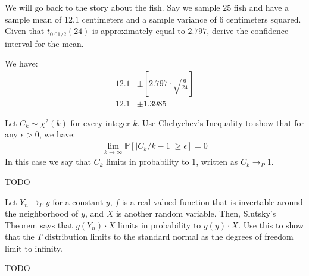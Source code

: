 
We will go back to the story about the fish. Say we sample $25$ fish and
have a sample mean of $12.1$ centimeters and a sample variance of $6$
centimeters squared. Given that $t_{0.01/2}(24)$ is approximately equal
to $2.797$, derive the confidence interval for the mean.



We have:
\begin{align*}
12.1 &\pm \left[ 2.797 \cdot \sqrt{\frac{6}{24}} \right] \\
12.1 &\pm 1.3985
\end{align*}


Let $C_k \sim \chi^2(k)$ for every integer $k$. Use Chebychev's Inequality to show
that for any $\epsilon > 0$, we have:
\begin{align*}
\lim_{k \rightarrow \infty} \mathbb{P} \left[ |C_k/k - 1| \geq \epsilon \right] = 0
\end{align*}
In this case we say that $C_k$ limits in probability to 1, written as
$C_k \rightarrow_P 1$.


TODO


Let $Y_n \rightarrow_P y$ for a constant $y$, $f$ is a real-valued function that
is invertable around the neighborhood of $y$, and $X$ is another random variable.
Then, Slutsky's Theorem says that $g(Y_n) \cdot X$ limits in probability to
$g(y) \cdot X$. Use this to show that the $T$ distribution limits to the standard
normal as the degrees of freedom limit to infinity.


TODO
